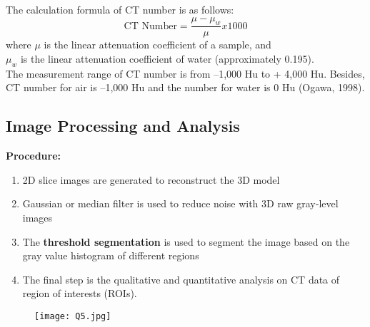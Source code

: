 \documentclass[fleqn, 11pt]{article}
\begin{document}
The calculation formula of CT number is as follows:
$$ \text{CT Number} = \frac{\mu - \mu_w}{\mu} x 1000$$
where $\mu$ is the linear attenuation coefficient of a sample, and\\
$\mu_w$ is the linear attenuation coefficient of water (approximately 0.195).\\
The measurement range of CT number is from –1,000 Hu to + 4,000 Hu. Besides, CT number for air is –1,000 Hu and the number for water is 0 Hu (Ogawa, 1998).

\subsection*{Image Processing and Analysis}
\textbf{Procedure:}
\begin{enumerate}[noitemsep]
    \item 2D slice images are generated to reconstruct the 3D model
    \item Gaussian or median filter is used to reduce noise with 3D raw gray‐level images
    \item The \textbf{threshold segmentation} is used to segment the image based on the gray value histogram of different regions
    \item The final step is the qualitative and quantitative analysis on CT data of region of interests (ROIs).
\end{enumerate}

\begin{figure}[H]
    \centering
    \texttt{[image: Q5.jpg]}
\end{figure}
\end{document}
